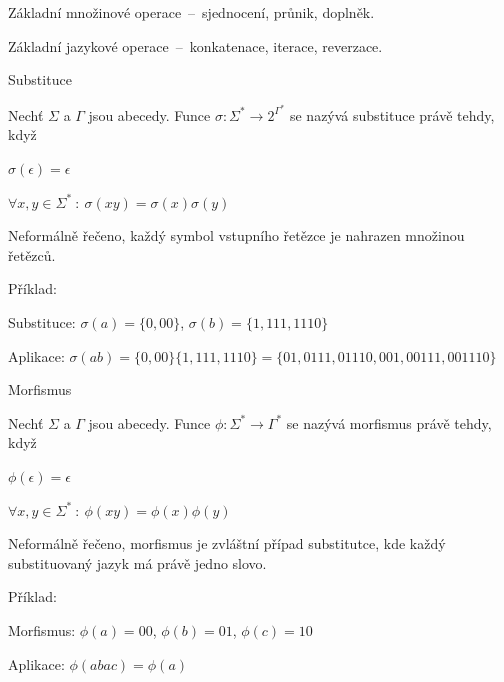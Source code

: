 \begin{compactitem}
    \item Základní množinové operace~--~sjednocení, průnik, doplněk.

    \item Základní jazykové operace~--~konkatenace, iterace, reverzace.

    \item Substituce \begin{compactitem}
        \item Nechť $\Sigma$ a $\Gamma$ jsou abecedy. Funce $\sigma : \Sigma^* \rightarrow 2^{\Gamma^*}$ se nazývá substituce právě tehdy, když \begin{compactitem}
            \item $\sigma(\epsilon) = \epsilon$
            \item $\forall x, y \in \Sigma^* ~:~ \sigma(xy) = \sigma(x) \sigma(y)$
        \end{compactitem}
        \item Neformálně řečeno, každý symbol vstupního řetězce je nahrazen množinou řetězců.
        \item Příklad: \begin{compactitem}
            \item Substituce: $\sigma(a) = \{0, 00\}$, $\sigma(b) = \{1, 111, 1110\}$
            \item Aplikace: $\sigma(ab) = \{0, 00\}\{1, 111, 1110\} = \{ 01, 0111, 01110, 001, 00111, 001110 \}$
        \end{compactitem}
    \end{compactitem}

    \item Morfismus \begin{compactitem}
        \item Nechť $\Sigma$ a $\Gamma$ jsou abecedy. Funce $\phi : \Sigma^* \rightarrow \Gamma^*$ se nazývá morfismus právě tehdy, když \begin{compactitem}
            \item $\phi(\epsilon) = \epsilon$
            \item $\forall x, y \in \Sigma^* ~:~ \phi(xy) = \phi(x) \phi(y)$
        \end{compactitem}
        \item Neformálně řečeno, morfismus je zvláštní případ substitutce, kde každý substituovaný jazyk má právě jedno slovo.
        \item Příklad: \begin{compactitem}
            \item Morfismus: $\phi(a) = 00$, $\phi(b) = 01$, $\phi(c) = 10$
            \item Aplikace: $\phi(abac) = \phi(a) $
        \end{compactitem}
    \end{compactitem}
\end{compactitem}

